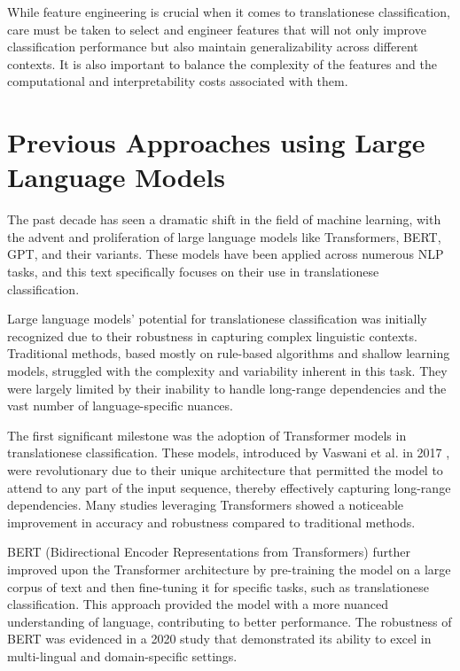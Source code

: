 While feature engineering is crucial when it comes to translationese classification, care must be taken to select and engineer features that will not only improve classification performance but also maintain generalizability across different contexts. It is also important to balance the complexity of the features and the computational and interpretability costs associated with them.



\section{Previous Approaches using Large Language Models}

The past decade has seen a dramatic shift in the field of machine learning, with the advent and proliferation of large language models like Transformers, BERT, GPT, and their variants. These models have been applied across numerous NLP tasks, and this text specifically focuses on their use in translationese classification.

Large language models' potential for translationese classification was initially recognized due to their robustness in capturing complex linguistic contexts. Traditional methods, based mostly on rule-based algorithms and shallow learning models, struggled with the complexity and variability inherent in this task. They were largely limited by their inability to handle long-range dependencies and the vast number of language-specific nuances.

The first significant milestone was the adoption of Transformer models in translationese classification. These models, introduced by Vaswani et al. in 2017 \cite{attention}, were revolutionary due to their unique architecture that permitted the model to attend to any part of the input sequence, thereby effectively capturing long-range dependencies. Many studies leveraging Transformers showed a noticeable improvement in accuracy and robustness compared to traditional methods.

BERT (Bidirectional Encoder Representations from Transformers) further improved upon the Transformer architecture by pre-training the model on a large corpus of text and then fine-tuning it for specific tasks, such as translationese classification. This approach provided the model with a more nuanced understanding of language, contributing to better performance. The robustness of BERT was evidenced in a 2020 study \cite{DBLPewfiovncoi} that demonstrated its ability to excel in multi-lingual and domain-specific settings.

